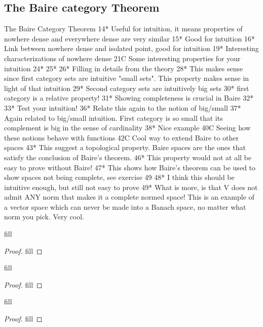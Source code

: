 \subsection{The Baire category Theorem}

The Baire Category Theorem
14* Useful for intuition, it means properties of nowhere dense and everywhere dense are very similar 
15* Good for intuition 
16* Link between nowhere dense and isolated point, good for intuition 
19* Interesting characterizations of nowhere dense 
21C Some interesting properties for your intuition 
24*
25*
26* Filling in details from the theory 
28* This makes sense since first category sets are intuitive "small sets". This property makes sense in light of that intuition
29* Second category sets are intuitively big sets 
30* first category is a relative property!
31* Showing completeness is crucial in Baire 
32* 
33* Test your intuition! 
36* Relate this again to the notion of big/small 
37* Again related to big/small intuition. First category is so small that its complement is big in the sense of cardinality 
38* Nice example 
40C Seeing how these notions behave with functions 
42C Cool way to extend Baire to other spaces 
43* This suggest a topological property. Baire spaces are the ones that satisfy the conclusion of Baire's theorem.
46* This property would not at all be easy to prove without Baire!
47* This shows how Baire's theorem can be used to show spaces not being complete, see exercise 49
48* I think this should be intuitive enough, but still not easy to prove 
49* What is more, is that V does not admit ANY norm that makes it a complete normed space! This is an example of a vector space which can never be made into a Banach space, no matter what norm you pick. Very cool. 


\begin{exercise}{14}
fill
\end{exercise}
\begin{proof}
fill
\end{proof} 

\begin{exercise}{15}
fill
\end{exercise}
\begin{proof}
fill
\end{proof} 

\begin{exercise}{16}
fill
\end{exercise}
\begin{proof}
fill
\end{proof} 

